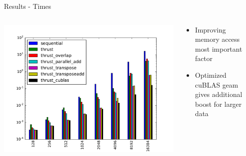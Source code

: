 \documentclass{beamer}
\begin{document}
\begin{frame}{Results - Times}
  \begin{columns}
    \begin{column}{7cm}
      \includegraphics[scale=0.4]{imgs/all_times.pdf} 
    \end{column}
    \begin{column}{3cm}
      \begin{itemize}
        \item Improving memory access most important factor
        \item Optimized cuBLAS geam gives additional boost for larger data
      \end{itemize}
    \end{column}
  \end{columns}
\end{frame} 
\end{document}
